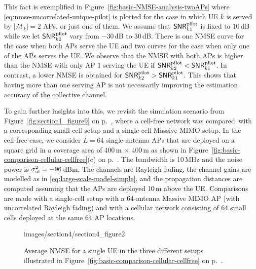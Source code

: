 This fact is exemplified in Figure~\ref{fig:basic-NMSE-analysis-twoAPs} where \eqref{eq:nmse-uncorrelated-unique-pilot} is plotted for the case in which UE $k$ is served by $|\mathcal{M}_k|=2$ APs, or just one of them. We assume that $\mathsf{SNR}_{k1}^{\text{pilot}}$ is fixed to $10$\,dB while we let $\mathsf{SNR}_{k2}^{\text{pilot}}$ vary from $-30$\,dB to $30$\,dB.  There is one NMSE curve for the case when both APs serve the UE and two curves for the case when only one of the APs serves the UE.
We observe that the NMSE with both APs is higher than the NMSE with only AP $1$ serving the UE if $\mathsf{SNR}_{k2}^{\text{pilot}} < \mathsf{SNR}_{k1}^{\text{pilot}}$. In contrast, a lower NMSE is obtained for $\mathsf{SNR}_{k2}^{\text{pilot}} > \mathsf{SNR}_{k1}^{\text{pilot}}$. This shows that having more than one serving AP is not necessarily improving the estimation accuracy of the collective channel.

To gain further insights into this, we revisit the simulation scenario from Figure~\ref{fig:section1_figure9} on p.~\pageref{fig:section1_figure9}, where a cell-free network was compared~with a corresponding small-cell setup and a single-cell Massive MIMO setup. In the cell-free case, we consider $L=64$ single-antenna APs that are deployed on a square grid in a coverage area of $400$\,m$\,\times\, 400$\,m as shown in Figure~\ref{fig:basic-comparison-cellular-cellfree}(c) on p.~\pageref{fig:basic-comparison-cellular-cellfree}. The bandwidth is 10\,MHz and the noise power is $\sigma^2_{\mathrm{ul}} = -96$\,dBm. The channels are Rayleigh fading, the channel gains are modelled as in \eqref{eq:large-scale-model-simple}, and the propagation distances are computed assuming that the \glspl{AP} are deployed 10\,m above the \gls{UE}. Comparisons are made with a single-cell setup with a 64-antenna Massive MIMO AP (with uncorrelated Rayleigh fading) and with a cellular network consisting of $64$ small cells deployed at the same $64$ AP locations.


\begin{figure}[t!]
	\begin{overpic}[width=\columnwidth,tics=10]{images/section4/section4_figure2}
\end{overpic} 
                \caption{Average NMSE for a single UE in the three different setups illustrated in Figure~\ref{fig:basic-comparison-cellular-cellfree} on p.~\pageref{fig:basic-comparison-cellular-cellfree}.}    \vspace{+2mm}
	\label{fig:basic-NMSE-comparison-cellular-cellfree} 
\end{figure}



